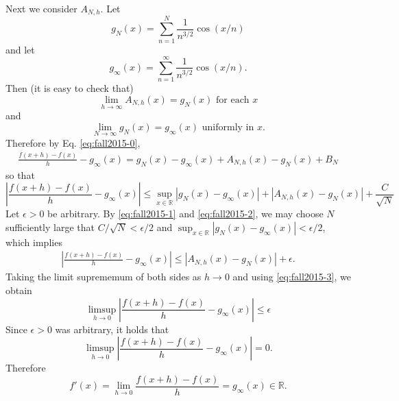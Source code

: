 \documentclass[answers]{exam}
\theoremstyle{problemstyle}
\newcommand{\1}[1]{\textbf{1}_{\left[#1\right]}} %
\begin{document}
\begin{questions}
\begin{parts}
\begin{solution}
        Next we consider $A_{N,h}$. Let
				\[ g_{N}(x) = \sum_{n=1}^{N}\frac{1}{n^{3/2}}\cos(x/n) \]
				and let
				\[ g_{\infty}(x) = \sum_{n=1}^{\infty}\frac{1}{n^{3/2}}\cos(x/n). \]
				Then (it is easy to check that)
        \begin{equation}\label{eq:fall2015-3}
          \lim_{h\to \infty} A_{N,h}(x)  = g_{N}(x) \text{ for each $x$}
        \end{equation}
        and
        \begin{equation}\label{eq:fall2015-2}
          \lim_{N \to \infty} g_{N}(x) = g_{\infty}(x) \text{ uniformly in $x$.}
        \end{equation}
        Therefore by Eq. \eqref{eq:fall2015-0},
        \begin{align*}
           \frac{f(x+h)-f(x)}{h}-g_{\infty}(x)
          = g_{N}(x)-g_{\infty}(x) +A_{N,h}(x)-g_{N}(x) +B_{N}
        \end{align*}
        so that
        \begin{equation*} 
          \left| \frac{f(x+h)-f(x)}{h}-g_{\infty}(x) \right| 
          \leq \sup_{x\in \mathbb{R}}\left|g_{N}(x)-g_{\infty}(x)\right| +\left|A_{N,h}(x)-g_{N}(x)\right| + \frac{C}{\sqrt{N}}
        \end{equation*}
        Let $\epsilon>0$ be arbitrary. By \eqref{eq:fall2015-1} and \eqref{eq:fall2015-2}, we may choose $N$ sufficiently
        large that $C/\sqrt{N} <\epsilon/2$ and $\sup_{x\in \mathbb{R}}\left|g_{N}(x)-g_{\infty}(x)\right|
        <\epsilon/2$, which implies
        \begin{align*} 
          \left| \frac{f(x+h)-f(x)}{h}-g_{\infty}(x) \right|
          \leq \left|A_{N,h}(x)-g_{N}(x)\right| + \epsilon.
        \end{align*}
        Taking the limit suprememum of both sides as $h\to 0$ and using \eqref{eq:fall2015-3}, we obtain
        \begin{equation*}
          \limsup_{h\to 0} \left| \frac{f(x+h)-f(x)}{h}-g_{\infty}(x) \right| \leq \epsilon
        \end{equation*}
        Since $\epsilon>0$ was arbitrary, it holds that
        \[ \limsup_{h\to 0} \left|
          \frac{f(x+h)-f(x)}{h}-g_{\infty}(x) \right| =0. \]
          Therefore
          \[ f'(x) = \lim_{h \to 0}
        \frac{f(x+h)-f(x)}{h}=g_{\infty}(x)\in \mathbb{R}. \]


\end{solution}
\end{parts}
\end{questions}
\end{document}
